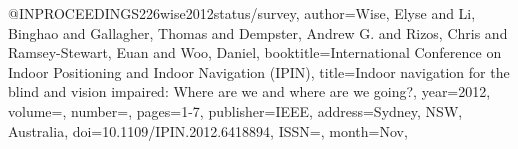 @INPROCEEDINGS{226wise2012status/survey,
author={Wise, Elyse and Li, Binghao and Gallagher, Thomas and Dempster, Andrew G. and Rizos, Chris and Ramsey-Stewart, Euan and Woo, Daniel},
booktitle={International Conference on Indoor Positioning and Indoor Navigation (IPIN)}, 
title={Indoor navigation for the blind and vision impaired: Where are we and where are we going?}, 
year={2012},
volume={},
number={},
pages={1-7},
publisher={IEEE},
address={Sydney, NSW, Australia},
doi={10.1109/IPIN.2012.6418894},
ISSN={},
month={Nov},}